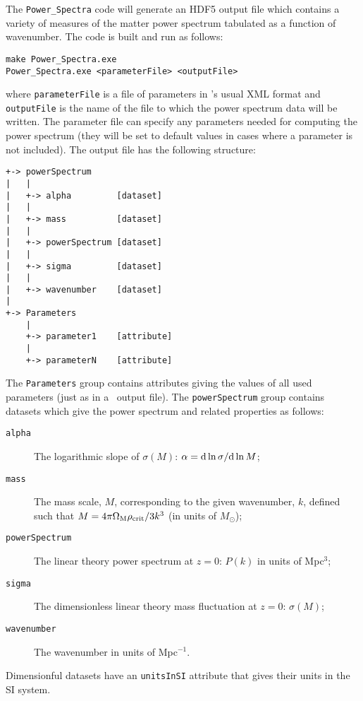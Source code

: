 The {\tt Power\_Spectra} code will generate an HDF5 output file which contains a variety of measures of the matter power spectrum tabulated as a function of wavenumber. The code is built and run as follows:
\begin{verbatim}
make Power_Spectra.exe
Power_Spectra.exe <parameterFile> <outputFile>
\end{verbatim}
where {\tt parameterFile} is a file of parameters in \glc's usual XML format and {\tt outputFile} is the name of the file to which the power spectrum data will be written. The parameter file can specify any parameters needed for computing the power spectrum (they will be set to default values in cases where a parameter is not included).
The output file has the following structure:
\begin{verbatim}
+-> powerSpectrum
|   |
|   +-> alpha         [dataset]
|   |
|   +-> mass          [dataset]
|   |
|   +-> powerSpectrum [dataset]
|   |
|   +-> sigma         [dataset]
|   |
|   +-> wavenumber    [dataset]
|    
+-> Parameters
    |
    +-> parameter1    [attribute]
    |
    +-> parameterN    [attribute]
\end{verbatim}
The {\tt Parameters} group contains attributes giving the values of all used parameters (just as in a \glc\ output file). The {\tt powerSpectrum} group contains datasets which give the power spectrum and related properties as follows:
\begin{description}
\item [{\tt alpha}] The logarithmic slope of $\sigma(M)$: $\alpha = {\rm d} \ln \sigma / {\rm d} \ln M$;
\item [{\tt mass}] The mass scale, $M$, corresponding to the given wavenumber, $k$, defined such that $M=4 \pi \Omega_{\rm M} \rho_{\rm crit} / 3 k^3$ (in units of $M_\odot$);
\item [{\tt powerSpectrum}] The linear theory power spectrum at $z=0$: $P(k)$ in units of Mpc$^3$;
\item [{\tt sigma}] The dimensionless linear theory mass fluctuation at $z=0$: $\sigma(M)$;
\item [{\tt wavenumber}] The wavenumber in units of Mpc$^{-1}$.
\end{description}
Dimensionful datasets have an {\tt unitsInSI} attribute that gives their units in the SI system.
